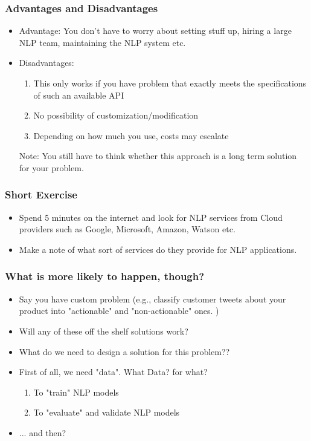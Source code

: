 \documentclass{beamer}
\begin{document}
\begin{frame}
\frametitle{Advantages and Disadvantages}
\begin{itemize}
    \item Advantage: You don't have to worry about setting stuff up,  hiring a large NLP team, maintaining the NLP system etc. 
    \item Disadvantages:
    \begin{enumerate}
        \item This only works if you have problem that exactly meets the specifications of such an available API
        \item No possibility of customization/modification  
        \item Depending on how much you use, costs may escalate
    \end{enumerate}
    Note: You still have to think whether this approach is a long term solution for your problem.
\end{itemize}
\end{frame}

\begin{frame}
\frametitle{Short Exercise}
\begin{itemize}
    \item Spend 5 minutes on the internet and look for NLP services from Cloud providers such as Google, Microsoft, Amazon, Watson etc.
    \item Make a note of what sort of services do they provide for NLP applications. 
\end{itemize}
\end{frame}

\begin{frame}
\frametitle{What is more likely to happen, though?}
\begin{itemize}
    \item Say you have custom problem (e.g., classify customer tweets about your product into "actionable" and "non-actionable" ones. )
    \item Will any of these off the shelf solutions work? \pause
    \item What do we need to design a solution for this problem?? \pause
    \item First of all, we need "data". What Data? for what? \pause
    \begin{enumerate}
        \item To "train" NLP models
        \item To "evaluate" and validate NLP models
    \end{enumerate}
    \pause \item ... and then?
\end{itemize}
\end{frame}
\end{document}
